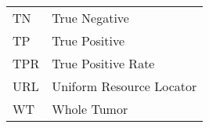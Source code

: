 \newpage
\begin{table}[H]
    \begin{tabular}{p{4cm} p{10cm}}
     TN     & True Negative \\
     TP     & True Positive \\
     TPR    & True Positive Rate \\
     URL    & Uniform Resource Locator \\
     WT     & Whole Tumor \\
\end{tabular}%
\end{table}%
